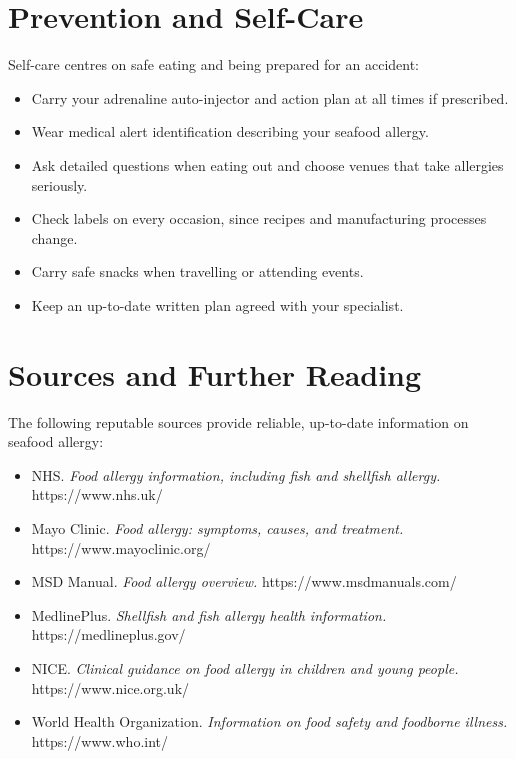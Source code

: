 \section*{Prevention and Self-Care}
Self-care centres on safe eating and being prepared for an accident:

\begin{itemize}
    \item Carry your adrenaline auto-injector and action plan at all times if prescribed.
    \item Wear medical alert identification describing your seafood allergy.
    \item Ask detailed questions when eating out and choose venues that take allergies seriously.
    \item Check labels on every occasion, since recipes and manufacturing processes change.
    \item Carry safe snacks when travelling or attending events.
    \item Keep an up-to-date written plan agreed with your specialist.
\end{itemize}

\section*{Sources and Further Reading}
The following reputable sources provide reliable, up-to-date information on seafood allergy:

\begin{itemize}
    \item NHS. \textit{Food allergy information, including fish and shellfish allergy.} https://www.nhs.uk/
    \item Mayo Clinic. \textit{Food allergy: symptoms, causes, and treatment.} https://www.mayoclinic.org/
    \item MSD Manual. \textit{Food allergy overview.} https://www.msdmanuals.com/
    \item MedlinePlus. \textit{Shellfish and fish allergy health information.} https://medlineplus.gov/
    \item NICE. \textit{Clinical guidance on food allergy in children and young people.} https://www.nice.org.uk/
    \item World Health Organization. \textit{Information on food safety and foodborne illness.} https://www.who.int/
\end{itemize}
